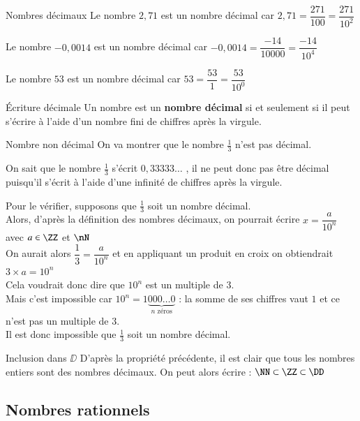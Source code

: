 \documentclass[oneside,12pt]{article}          %
\begin{document}
\begin{exemple}{Nombres décimaux}
	Le nombre $2,71$ est un nombre décimal car $2,71 = \dfrac{271}{100}=\dfrac{271}{10^2}$
	
	Le nombre $-0,0014$ est un nombre décimal car $-0,0014=\dfrac{-14}{10000}=\dfrac{-14}{10^4}$
	
	Le nombre $53$ est un nombre décimal car $53=\dfrac{53}{1}=\dfrac{53}{10^0}$
\end{exemple}



\begin{propriete}{Écriture décimale}
	Un nombre est un \textbf{nombre décimal} si et seulement si il peut s'écrire à l'aide d'un nombre fini de chiffres après la virgule.
\end{propriete}

\begin{exemple}{Nombre non décimal}
	On va montrer que le nombre $\frac{1}{3}$ n'est pas décimal.

	On sait que le nombre $\frac{1}{3}$ s'écrit $0,33333\ldots$ , il ne peut donc pas être décimal puisqu'il s'écrit à l'aide d'une infinité de chiffres après la virgule.

	Pour le vérifier, supposons que $\frac{1}{3}$ soit un nombre décimal.\\
	Alors, d'après la définition des nombres décimaux, on pourrait écrire $x=\dfrac{a}{10^n}$ avec $a\in\ZZ$ et $\nN$\\
	On aurait alors $\dfrac{1}{3}=\dfrac{a}{10^n}$ et en appliquant un produit en croix on obtiendrait $3\times a=10^n$\\
	Cela voudrait donc dire que $10^n$ est un multiple de 3.\\
	Mais c'est impossible car $10^n=1\underbrace{000\ldots0}_{n \text{ zéros}}$ : la somme de ses chiffres vaut $1$ et ce n'est pas un multiple de 3.\\
	Il est donc impossible que $\frac{1}{3}$ soit un nombre décimal.
\end{exemple}



\begin{propriete}{Inclusion dans $\DD$}
	D'après la propriété précédente, il est clair que tous les nombres entiers sont des nombres décimaux. On peut alors écrire : $\NN\subset\ZZ\subset\DD$
\end{propriete}


\subsection{Nombres rationnels}
\end{document}
